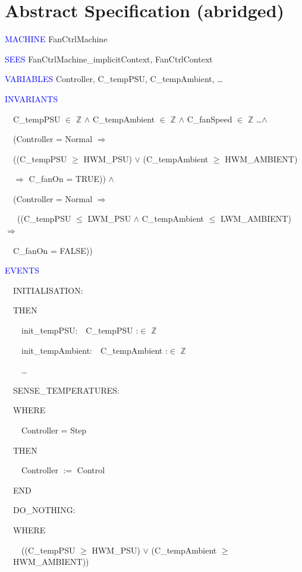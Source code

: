 \documentclass{llncs}%
\begin{document}
\section{Abstract Specification (abridged)}\label{abst}
\scriptsize
\textcolor{blue}{MACHINE} FanCtrlMachine 

\textcolor{blue}{SEES} FanCtrlMachine\_implicitContext, FanCtrlContext 

\textcolor{blue}{VARIABLES} Controller, C\_tempPSU, C\_tempAmbient, \ldots \ \  \ 

\textcolor{blue}{INVARIANTS}

\ \ C\_tempPSU ${\in}$ $\mathbb{Z}$  ${\wedge}$ C\_tempAmbient ${\in}$ $\mathbb{Z}$  ${\wedge}$ C\_fanSpeed ${\in}$ $\mathbb{Z}$ \ldots ${\wedge}$ \ 

\ \ (Controller = Normal $\Rightarrow $ \

 \ \ ((C\_tempPSU ${\geq}$ HWM\_PSU) ${\vee}$ (C\_tempAmbient ${\geq}$
HWM\_AMBIENT)\

\ \ \quad $\Rightarrow $ C\_fanOn = TRUE)) ${\wedge}$\ \  \ 

\ \ (Controller = Normal $\Rightarrow $

\ \   \ ((C\_tempPSU ${\leq}$ LWM\_PSU ${\wedge}$ C\_tempAmbient ${\leq}$
LWM\_AMBIENT) $\Rightarrow $ \

\ \ \quad C\_fanOn = FALSE))\ \ 

\bigskip
\textcolor{blue}{EVENTS}

\ \ INITIALISATION:\ \ 

\ \ THEN

\ \ \ \ init\_tempPSU:\ \ C\_tempPSU :${\in}$ $\mathbb{Z}$ 

\ \ \ \ init\_tempAmbient:\ \ C\_tempAmbient :${\in}$ $\mathbb{Z}$ 

\ \ \ \ {\dots}

\bigskip

\ \ SENSE\_TEMPERATURES:\ \  \ 

\ \ WHERE

\ \ \ \ Controller = Step \ \ 

\ \ THEN

\ \ \ \ Controller $:=$ Control 

\ \ END

\bigskip

\ \ DO\_NOTHING:\ \  \ 

\ \ WHERE

\ \ \ \ {\textlnot}((C\_tempPSU ${\geq}$ HWM\_PSU) ${\vee}$
(C\_tempAmbient ${\geq}$ \ \ HWM\_AMBIENT)) 
\end{document}
